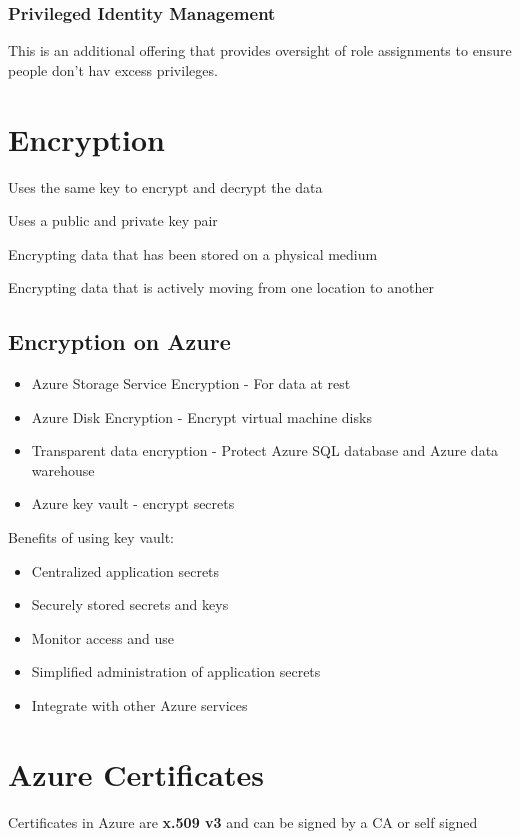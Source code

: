 \documentclass{article}[18pt]
\begin{document}
\subsubsection{Privileged Identity Management}
This is an additional offering that provides oversight of role assignments to ensure people don't hav excess privileges. 
\section{Encryption}
\begin{definition}
	Uses the same key to encrypt and decrypt the data
\end{definition}
\begin{definition}
	Uses a public and private key pair
\end{definition}
\begin{definition}
	Encrypting data that has been stored on a physical medium
\end{definition}
\begin{definition}
	Encrypting data that is actively moving from one location to another
\end{definition}
\subsection{Encryption on Azure}
\begin{itemize}
	\item Azure Storage Service Encryption - For data at rest
	\item Azure Disk Encryption - Encrypt virtual machine disks
	\item Transparent data encryption - Protect Azure SQL database and Azure data warehouse
	\item Azure key vault - encrypt secrets
\end{itemize}
Benefits of using key vault:
\begin{itemize}
	\item Centralized application secrets
	\item Securely stored secrets and keys
	\item Monitor access and use
	\item Simplified administration of application secrets
	\item Integrate with other Azure services
\end{itemize}
\section{Azure Certificates}
Certificates in Azure are \textbf{x.509 v3} and can be signed by a CA or self signed
\end{document}
